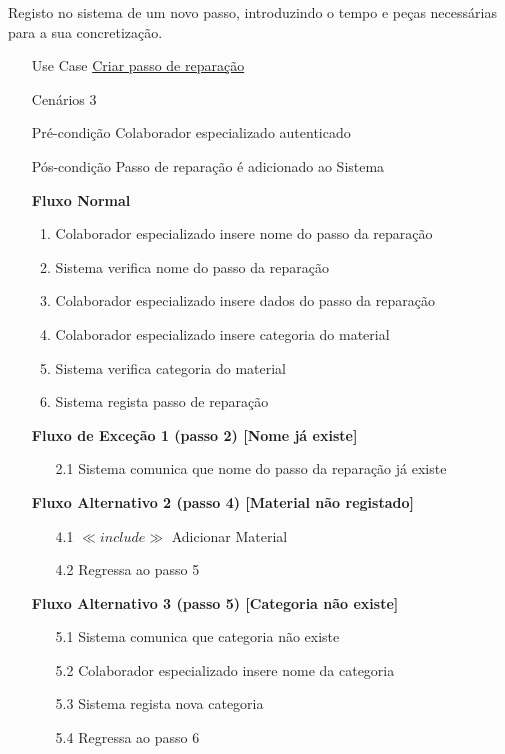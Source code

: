 \documentclass[../relatorio.tex]{subfiles}
\begin{document}
Registo no sistema de um novo passo, introduzindo o tempo e peças necessárias para a sua concretização.
\begin{itemize}
    \item[Use Case] {\underline{Criar passo de reparação}}
    \item[Cenários] {3}
    \item[Pré-condição] {Colaborador especializado autenticado}
    \item[Pós-condição] {Passo de reparação é adicionado ao Sistema}
          \begin{flushleft}
              \textbf{Fluxo Normal}
          \end{flushleft}
          \begin{enumerate}
              \item Colaborador especializado insere nome do passo da reparação
              \item Sistema verifica nome do passo da reparação
              \item Colaborador especializado insere dados do passo da reparação
              \item Colaborador especializado insere categoria do material
              \item Sistema verifica categoria do material
              \item Sistema regista passo de reparação
          \end{enumerate}
          \begin{flushleft}
            \textbf{Fluxo de Exceção 1 (passo 2) [Nome já existe]}
        \end{flushleft}
        \begin{itemize}
            \item[2.1]  Sistema comunica que nome do passo da reparação já existe
        \end{itemize}
          \begin{flushleft}
		      \textbf{Fluxo Alternativo 2 (passo 4) [Material não registado]}
	      \end{flushleft}
	      \begin{itemize}
		      \item[4.1]  $\ll include \gg$ Adicionar Material
              \item[4.2] Regressa ao passo 5
	      \end{itemize}
          \begin{flushleft}
            \textbf{Fluxo Alternativo 3 (passo 5) [Categoria não existe]}
        \end{flushleft}
        \begin{itemize}
            \item[5.1] Sistema comunica que categoria não existe 
            \item[5.2] Colaborador especializado insere nome da categoria 
            \item[5.3] Sistema regista nova categoria
            \item[5.4] Regressa ao passo 6
        \end{itemize}
\end{itemize}
\end{document}
